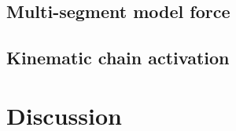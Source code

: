 \documentclass[twocolumn]{aastex631}
\begin{document}
\subsection{Multi-segment model force}

\subsection{Kinematic chain activation}

\section{Discussion}
\label{sec:discussion}





\end{document}
